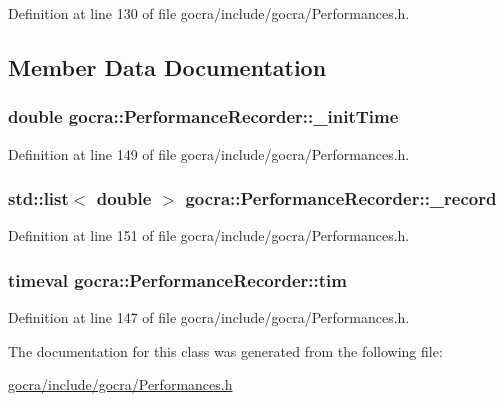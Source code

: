 Definition at line 130 of file gocra/include/gocra/\+Performances.\+h.



\subsection{Member Data Documentation}
\subsubsection[{\texorpdfstring{\+\_\+init\+Time}{_initTime}}]{\setlength{\rightskip}{0pt plus 5cm}double gocra\+::\+Performance\+Recorder\+::\+\_\+init\+Time\hspace{0.3cm}{\ttfamily [protected]}}\hypertarget{classgocra_1_1PerformanceRecorder_a45440c78a3cd0f651d5b18f0b4a268c7}{}\label{classgocra_1_1PerformanceRecorder_a45440c78a3cd0f651d5b18f0b4a268c7}


Definition at line 149 of file gocra/include/gocra/\+Performances.\+h.

\subsubsection[{\texorpdfstring{\+\_\+record}{_record}}]{\setlength{\rightskip}{0pt plus 5cm}std\+::list$<$ double $>$ gocra\+::\+Performance\+Recorder\+::\+\_\+record\hspace{0.3cm}{\ttfamily [protected]}}\hypertarget{classgocra_1_1PerformanceRecorder_ad68f215e892c377e5dda90f883d00714}{}\label{classgocra_1_1PerformanceRecorder_ad68f215e892c377e5dda90f883d00714}


Definition at line 151 of file gocra/include/gocra/\+Performances.\+h.

\subsubsection[{\texorpdfstring{tim}{tim}}]{\setlength{\rightskip}{0pt plus 5cm}timeval gocra\+::\+Performance\+Recorder\+::tim\hspace{0.3cm}{\ttfamily [protected]}}\hypertarget{classgocra_1_1PerformanceRecorder_ab953e4252c10603dc8c25634f471db5a}{}\label{classgocra_1_1PerformanceRecorder_ab953e4252c10603dc8c25634f471db5a}


Definition at line 147 of file gocra/include/gocra/\+Performances.\+h.



The documentation for this class was generated from the following file\+:\begin{DoxyCompactItemize}
\item 
\hyperlink{gocra_2include_2gocra_2Performances_8h}{gocra/include/gocra/\+Performances.\+h}\end{DoxyCompactItemize}
